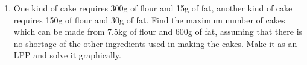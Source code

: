 \begin{enumerate}

\item One kind of cake requires 300g of flour and 15g of fat, another kind of cake requires 150g of flour and 30g of fat. Find the maximum number of cakes which can be made from 7.5kg of flour and 600g of fat, assuming that there is no shortage of the other ingredients used in making the cakes. Make it as an LPP and solve it graphically.

\end{enumerate}